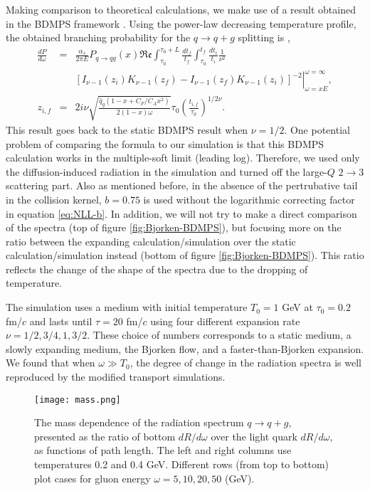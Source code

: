 Making comparison to theoretical calculations, we make use of a result obtained in the BDMPS framework \cite{Baier:1996kr,Baier:1998yf}.
Using the power-law decreasing temperature profile, the obtained branching probability for the $q\rightarrow q+g$ splitting is \cite{Baier:1998yf},
\begin{eqnarray}
\frac{dP}{d\omega} &=& \frac{\alpha_s}{2\pi E}P_{q\rightarrow qg}(x)\mathfrak{Re}\int_{\tau_0}^{\tau_0+L}\frac{dt_f}{t_f}\int_{\tau_0}^{t_f}\frac{dt_i}{t_i} \frac{1}{\nu^2}\\
\nonumber
&& \left.\left[ I_{\nu-1}(z_i)K_{\nu-1}(z_f)-I_{\nu-1}(z_f)K_{\nu-1}(z_i)\right]^{-2}\right|_{\omega=xE}^{\omega=\infty},\\
z_{i,f} &=& 2i\nu \sqrt{\frac{\hat{q}_g(1-x+C_F/C_A x^2)}{2(1-x)\omega}} \tau_0 \left( \frac{t_{i,f}}{\tau_0}\right) ^{1/2\nu}.
\end{eqnarray}
This result goes back to the static BDMPS result \cite{Baier:1996kr} when $\nu=1/2$.
One potential problem of comparing the formula to our simulation is that this BDMPS calculation works in the multiple-soft limit (leading log).
Therefore, we used only the diffusion-induced radiation in the simulation and turned off the large-$Q$ $2\rightarrow 3$ scattering part.
Also as mentioned before, in the absence of the pertrubative tail in the collision kernel, $b=0.75$ is used without the logarithmic correcting factor in equation \ref{eq:NLL-b}.
In addition, we will not try to make a direct comparison of the spectra (top of figure \ref{fig:Bjorken-BDMPS}), but focusing more on the ratio between the expanding calculation/simulation over the static calculation/simulation instead (bottom of figure \ref{fig:Bjorken-BDMPS}).
This ratio reflects the change of the shape of the spectra due to the dropping of temperature.

The simulation uses a medium with initial temperature $T_0=1$ GeV at $\tau_0=0.2$ fm/$c$ and lasts until $\tau = 20$ fm/$c$ using four different expansion rate $\nu = 1/2, 3/4, 1, 3/2$.
These choice of numbers corresponds to a static medium, a slowly expanding medium, the Bjorken flow, and a faster-than-Bjorken expansion.
We found that when $\omega \gg T_0$, the degree of change in the radiation spectra is well reproduced by the modified transport simulations.

\begin{figure}
\texttt{[image: mass.png]}
\caption{The mass dependence of the radiation spectrum $q\rightarrow q+g$, presented as the ratio of bottom $dR/d\omega$ over the light quark $dR/d\omega$, as functions of path length. The left and right columns use temperatures 0.2 and 0.4 GeV. Different rows (from top to bottom) plot cases for gluon energy $\omega = 5, 10, 20, 50$ (GeV).}
\label{fig:mass}
\end{figure}

